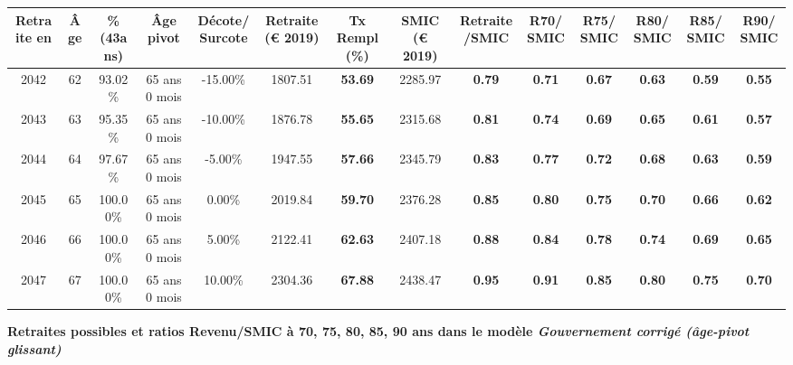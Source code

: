 \begin{adjustbox}{max width=\textwidth} 
\begin{tabular}[htb]{|c|c||c|c|c||c|c||c|c||c|c|c|c|c|} 
\hline 
 Retraite en &  Âge &  \%(43ans) &  Âge pivot &  Décote/Surcote &  Retraite (\euro{} 2019) &  Tx Rempl(\%) &  SMIC (\euro{} 2019) &  Retraite/SMIC &  R70/SMIC &  R75/SMIC &  R80/SMIC &  R85/SMIC &  R90/SMIC \\ 
\hline \hline 
 2042 &  62 &  93.02\% &  65 ans 0 mois &  -15.00\% &  1807.51 &  {\bf 53.69} &  2285.97 &  {\bf {\color{red} 0.79}} &  {\bf {\color{red} 0.71}} &  {\bf {\color{red} 0.67}} &  {\bf {\color{red} 0.63}} &  {\bf {\color{red} 0.59}} &  {\bf {\color{red} 0.55}} \\ 
\hline 
 2043 &  63 &  95.35\% &  65 ans 0 mois &  -10.00\% &  1876.78 &  {\bf 55.65} &  2315.68 &  {\bf {\color{red} 0.81}} &  {\bf {\color{red} 0.74}} &  {\bf {\color{red} 0.69}} &  {\bf {\color{red} 0.65}} &  {\bf {\color{red} 0.61}} &  {\bf {\color{red} 0.57}} \\ 
\hline 
 2044 &  64 &  97.67\% &  65 ans 0 mois &  -5.00\% &  1947.55 &  {\bf 57.66} &  2345.79 &  {\bf {\color{red} 0.83}} &  {\bf {\color{red} 0.77}} &  {\bf {\color{red} 0.72}} &  {\bf {\color{red} 0.68}} &  {\bf {\color{red} 0.63}} &  {\bf {\color{red} 0.59}} \\ 
\hline 
 2045 &  65 &  100.00\% &  65 ans 0 mois &  0.00\% &  2019.84 &  {\bf 59.70} &  2376.28 &  {\bf {\color{red} 0.85}} &  {\bf {\color{red} 0.80}} &  {\bf {\color{red} 0.75}} &  {\bf {\color{red} 0.70}} &  {\bf {\color{red} 0.66}} &  {\bf {\color{red} 0.62}} \\ 
\hline 
 2046 &  66 &  100.00\% &  65 ans 0 mois &  5.00\% &  2122.41 &  {\bf 62.63} &  2407.18 &  {\bf {\color{red} 0.88}} &  {\bf {\color{red} 0.84}} &  {\bf {\color{red} 0.78}} &  {\bf {\color{red} 0.74}} &  {\bf {\color{red} 0.69}} &  {\bf {\color{red} 0.65}} \\ 
\hline 
 2047 &  67 &  100.00\% &  65 ans 0 mois &  10.00\% &  2304.36 &  {\bf 67.88} &  2438.47 &  {\bf {\color{red} 0.95}} &  {\bf {\color{red} 0.91}} &  {\bf {\color{red} 0.85}} &  {\bf {\color{red} 0.80}} &  {\bf {\color{red} 0.75}} &  {\bf {\color{red} 0.70}} \\ 
\hline 
\hline 
\end{tabular} 
\end{adjustbox} 
 
 \vspace{0.1cm} 
{\bf \noindent Retraites possibles et ratios Revenu/SMIC à 70, 75, 80, 85, 90 ans dans le modèle \emph{Gouvernement corrigé (âge-pivot glissant)}}  
 

